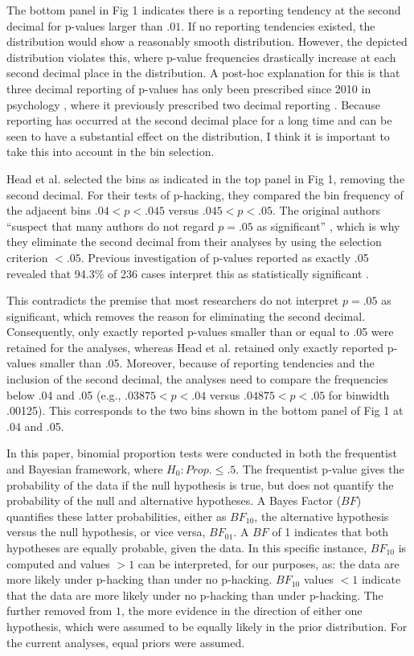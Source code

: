 The bottom panel in Fig 1 indicates there is a reporting tendency at the second decimal for p-values larger than $.01$. If no reporting tendencies existed, the distribution would show a reasonably smooth distribution. However, the depicted distribution violates this, where p-value frequencies drastically increase at each second decimal place in the distribution. A post-hoc explanation for this is that three decimal reporting of p-values has only been prescribed since 2010 in psychology \cite{American_Psychological_Association2010-qe}, where it previously prescribed two decimal reporting \cite{American_Psychological_Association1983-yf, American_Psychological_Association2001-uw}. Because reporting has occurred at the second decimal place for a long time and can be seen to have a substantial effect on the distribution, I think it is important to take this into account in the bin selection.

Head et al. selected the bins as indicated in the top panel in Fig 1, removing the second decimal. For their tests of p-hacking, they compared the bin frequency of the adjacent bins $.04<p<.045$ versus $.045<p<.05$. The original authors “suspect that many authors do not regard $p=.05$ as significant” \cite{Head_2015}, which is why they eliminate the second decimal from their analyses by using the selection criterion $<.05$. Previous investigation of p-values reported as exactly .05 revealed that 94.3\% of 236 cases interpret this as statistically significant \cite{Nuijten2015}.

This contradicts the premise that most researchers do not interpret $p=.05$ as significant, which removes the reason for eliminating the second decimal. Consequently, only exactly reported p-values smaller than or equal to .05 were retained for the analyses, whereas Head et al. retained only exactly reported p-values smaller than .05. Moreover, because of reporting tendencies and the inclusion of the second decimal, the analyses need to compare the frequencies below .04 and .05 (e.g., $.03875<p<.04$ versus $.04875<p<.05$ for binwidth .00125). This corresponds to the two bins shown in the bottom panel of Fig 1 at .04 and .05.

In this paper, binomial proportion tests were conducted in both the frequentist and Bayesian framework, where $H_0:Prop.\leq.5$. The frequentist p-value gives the probability of the data if the null hypothesis is true, but does not quantify the probability of the null and alternative hypotheses. A Bayes Factor ($BF$) quantifies these latter probabilities, either as $BF_{10}$, the alternative hypothesis versus the null hypothesis, or vice versa, $BF_{01}$. A $BF$ of 1 indicates that both hypotheses are equally probable, given the data. In this specific instance, $BF_{10}$ is computed and values $>1$ can be interpreted, for our purposes, as: the data are more likely under p-hacking than under no p-hacking. $BF_{10}$ values $<1$ indicate that the data are more likely under no p-hacking than under p-hacking. The further removed from $1$, the more evidence in the direction of either one hypothesis, which were assumed to be equally likely in the prior distribution. For the current analyses, equal priors were assumed.

  
  
  